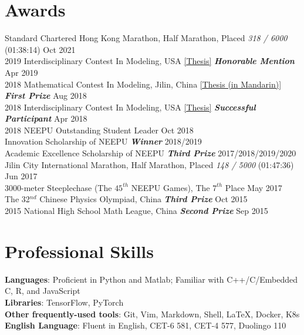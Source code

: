 \documentclass{my_cv}
\begin{document}
\hspace*{\fill}

\section{Awards}

 Standard Chartered Hong Kong Marathon, Half Marathon, Placed \emph{318 / 6000} (01:38:14) \hfill Oct 2021 \\
2019 Interdisciplinary Contest In Modeling, USA \href{https://shuyuej.com/files/ICM-2019.pdf}{[Thesis]}  \textbf{\emph{Honorable Mention}} \hfill Apr 2019 \\
2018 Mathematical Contest In Modeling, Jilin, China \href{https://shuyuej.com/files/MCM-2018.pdf}{[Thesis (in Mandarin)]}  \textbf{\emph{First Prize}} \hfill Aug 2018 \\
2018 Interdisciplinary Contest In Modeling, USA \href{https://shuyuej.com/files/ICM-2018.pdf}{[Thesis]}  \textbf{\emph{Successful Participant}} \hfill Apr 2018 \\
2018 NEEPU Outstanding Student Leader \hfill Oct 2018 \\
Innovation Scholarship of NEEPU  \textbf{\emph{Winner}} \hfill 2018/2019 \\
Academic Excellence Scholarship of NEEPU  \textbf{\emph{Third Prize}} \hfill 2017/2018/2019/2020 \\
Jilin City International Marathon, Half Marathon, Placed \emph{148 / 5000} (01:47:36) \hfill Jun 2017 \\
3000-meter Steeplechase (The $45^{th}$ NEEPU Games), The $7^{th}$ Place \hfill May 2017 \\
The 32$^{nd}$ Chinese Physics Olympiad, China  \textbf{\emph{Third Prize}} \hfill Oct 2015 \\
2015 National High School Math League, China  \textbf{\emph{Second Prize}} \hfill Sep 2015

\hspace*{\fill}

\section{Professional Skills}

\noindent \textbf{Languages}: Proficient in Python and Matlab; Familiar with C++/C/Embedded C, R, and JavaScript \\
\textbf{Libraries}: TensorFlow, PyTorch \\
\textbf{Other frequently-used tools}: Git, Vim, Markdown, Shell, \LaTeX, Docker, K8s \\
\textbf{English Language}: Fluent in English, CET-6 581, CET-4 577, Duolingo 110
\end{document}
